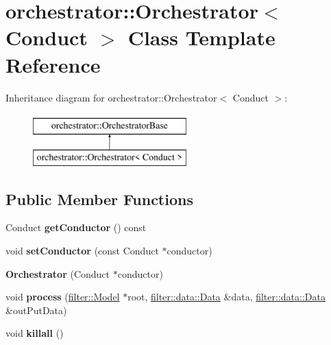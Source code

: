\hypertarget{classorchestrator_1_1_orchestrator}{}\section{orchestrator\+:\+:Orchestrator$<$ Conduct $>$ Class Template Reference}
\label{classorchestrator_1_1_orchestrator}
Inheritance diagram for orchestrator\+:\+:Orchestrator$<$ Conduct $>$\+:\begin{figure}[H]
\begin{center}
\leavevmode
\includegraphics[height=2.000000cm]{db/def/classorchestrator_1_1_orchestrator}
\end{center}
\end{figure}
\subsection*{Public Member Functions}
\begin{DoxyCompactItemize}
\item 
\mbox{\label{classorchestrator_1_1_orchestrator_a22aeb3d344c0102f9ff673a88c5eebc7}} 
Conduct {\bfseries get\+Conductor} () const
\item 
\mbox{\label{classorchestrator_1_1_orchestrator_a51858a0b58a668ae75df30e8cc98763c}} 
void {\bfseries set\+Conductor} (const Conduct $\ast$conductor)
\item 
\mbox{\label{classorchestrator_1_1_orchestrator_a8cbe2ebfed89591ee698b4016428a94b}} 
{\bfseries Orchestrator} (Conduct $\ast$conductor)
\item 
\mbox{\label{classorchestrator_1_1_orchestrator_a2d4622bddfc7fdf2fecfc9a45c7470bb}} 
void {\bfseries process} (\hyperlink{classfilter_1_1_model}{filter\+::\+Model} $\ast$root, \hyperlink{classfilter_1_1data_1_1_data}{filter\+::data\+::\+Data} \&data, \hyperlink{classfilter_1_1data_1_1_data}{filter\+::data\+::\+Data} \&out\+Put\+Data)
\item 
\mbox{\label{classorchestrator_1_1_orchestrator_a1070185c6c01d60a3490fa6f2641b751}} 
void {\bfseries killall} ()
\end{DoxyCompactItemize}
